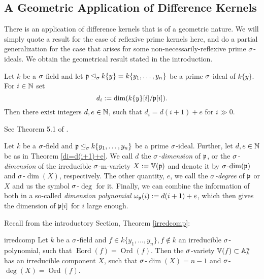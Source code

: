 \subsection{A Geometric Application of Difference Kernels}

There is an application of difference kernels that is of a geometric nature. We will simply quote a result for the case of reflexive prime kernels here,
and do a partial generalization for the case that arises for some non-necessarily-reflexive prime $\sigma$-ideals. We obtain the geometrical result stated in the introduction.

\begin{theorem}\label{di=d(i+1)+e}
Let $k$ be a $\sigma$-field and let $\mathfrak{p} \unlhd_{\sigma} k\{y\} = k\{y_1,\ldots,y_n\}$ be a prime $\sigma$-ideal of $k\{y\}$. For $i \in \mathbb{N}$ set $$d_i := \dim(k\{y\}[i]/\mathfrak{p}[i]).$$
Then there exist integers $d, e \in \mathbb{N}$, such that $d_i = d(i+1) + e$ for $i \gg 0$. %
\begin{bew}
See Theorem 5.1 of \cite{wibmer}.
\end{bew}
\end{theorem}

\begin{defn}
Let $k$ be a $\sigma$-field and $\mathfrak{p} \unlhd_{\sigma} k\{y_1,\ldots,y_n\}$ be a prime $\sigma$-ideal. Further, let $d, e \in \mathbb{N}$ be as in Theorem \ref{di=d(i+1)+e}. We call $d$ the \emph{$\sigma$-dimension} of $\mathfrak{p}$, 
or the \emph{$\sigma$-dimension} of the irreducible $\sigma$-m-variety $X:= \mathbb{V}(\mathfrak{p})$ and denote it by $\sigma$-$\dim(\mathfrak{p})$ and $\sigma$-$\dim(X)$, respectively. The other quantity, $e$, we call the \emph{$\sigma$-degree} of $\mathfrak{p}$ or $X$ 
and us the symbol $\sigma$-$\operatorname{deg}$ for it. Finally, we can combine the information of both in a so-called \emph{dimension polynomial} $\omega_{\mathfrak{p}}(i) := d(i+1) + e$, which then gives the dimension of $\mathfrak{p}[i]$ for $i$ large enough.
  
\end{defn}

Recall from the introductory Section, Theorem \ref{irredcomp}:
\begin{reptheorem}{irredcomp}
Let $k$ be a $\sigma$-field and $f \in k\{y_1,\ldots,y_n\}, f \notin k$ an irreducible $\sigma$-polynomial, such that $\operatorname{Eord}(f) = \operatorname{Ord}(f)$. Then the $\sigma$-variety $\mathbb{V}(f) \subset \mathbb{A}_k^n$ has an irreducible component $X$, such that $\sigma$-$\dim(X) = n-1$ and $\sigma$-$\operatorname{deg}(X) = \operatorname{Ord}(f)$.
\end{reptheorem}

